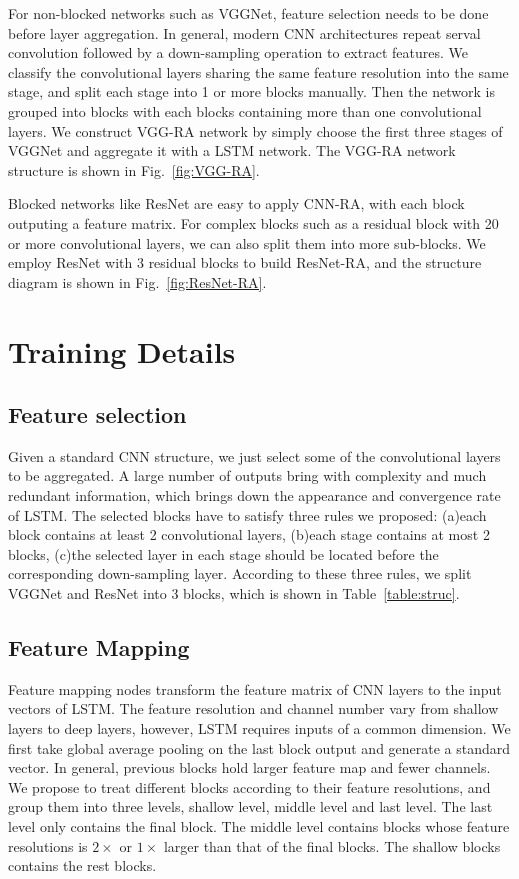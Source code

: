\documentclass[conference]{IEEEtran}
\begin{document}
For non-blocked networks such as VGGNet, feature selection needs to be done before layer aggregation. In general, modern CNN architectures repeat serval convolution followed by a down-sampling operation to extract features. We classify the convolutional layers sharing the same feature resolution into the same stage, and split each stage into 1 or more blocks manually. Then the network is grouped into blocks with each blocks containing more than one convolutional layers. We construct VGG-RA network by simply choose the first three stages of VGGNet and aggregate it with a LSTM network. The VGG-RA network structure is shown in Fig.~\ref{fig:VGG-RA}.

Blocked networks like ResNet are easy to apply CNN-RA, with each block outputing a feature matrix. For complex blocks such as a residual block with 20 or more convolutional layers, we can also split them into more sub-blocks. We employ ResNet with 3 residual blocks to build ResNet-RA, and the structure diagram is shown in Fig.~\ref{fig:ResNet-RA}.


\section{Training Details}
\subsection{Feature selection}
Given a standard CNN structure, we just select some of the convolutional layers to be aggregated. A large number of outputs bring with complexity and much redundant information, which brings down the appearance and convergence rate of LSTM. The selected blocks have to satisfy three rules we proposed: (a)each block contains at least 2 convolutional layers, (b)each stage contains at most 2 blocks, (c)the selected layer in each stage should be located before the corresponding down-sampling layer. According to these three rules, we split VGGNet and ResNet into 3 blocks, which is shown in Table~\ref{table:struc}.
\subsection{Feature Mapping}

Feature mapping nodes transform the feature matrix of CNN layers to the input vectors of LSTM. The feature resolution and channel number vary from shallow layers to deep layers, however, LSTM requires inputs of a common dimension. We first take global average pooling on the last block output and generate a standard vector. In general, previous blocks hold larger feature map and fewer channels. We propose to treat different blocks according to their feature resolutions, and group them into three levels, shallow level, middle level and last level. The last level only contains the final block. The middle level contains blocks whose feature resolutions is $2\times$ or $1\times$ larger than that of the final blocks. The shallow blocks contains the rest blocks. 
\end{document}
